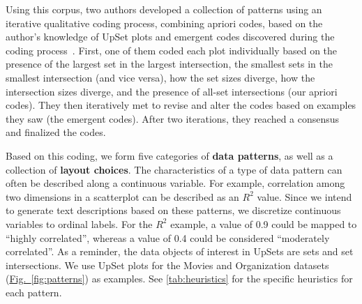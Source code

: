 \documentclass{egpubl}
\newcommand{\figref}[1]{\hyperref[#1]{Fig.~\ref*{#1}}}
\begin{document}
Using this corpus, two authors developed a collection of patterns using an iterative qualitative coding process, combining apriori codes, based on the author's knowledge of UpSet plots and emergent codes discovered during the coding process~\cite{king_template_1998}.
First, one of them coded each plot individually based on the presence of the largest set in the largest intersection, the smallest sets in the smallest intersection (and vice versa), how the set sizes diverge, how the intersection sizes diverge, and the presence of all-set intersections (our apriori codes).
They then iteratively met to revise and alter the codes based on examples they saw (the emergent codes).
After two iterations, they reached a consensus and finalized the codes.

Based on this coding, we form five categories of \textbf{data patterns}, as well as a collection of \textbf{layout choices}.
The characteristics of a type of data pattern can often be described along a continuous variable. For example, correlation among two dimensions in a scatterplot can be described as an $R^2$ value. Since we intend to generate text descriptions based on these patterns, we discretize continuous variables to ordinal labels. For the $R^2$ example, a value of 0.9 could be mapped to ``highly correlated'', whereas a value of 0.4 could be considered ``moderately correlated''.
As a reminder, the data objects of interest in UpSets are sets and set intersections. We use UpSet plots for the Movies and Organization datasets (\figref{fig:patterns}) as examples. See \autoref{tab:heuristics} for the specific heuristics for each pattern.
\end{document}
